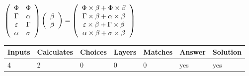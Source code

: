 \documentclass[12pt]{article}
\begin{document}
$  %
 \left( \begin{array}
 {
 c
 c
 }
 \Phi & 
 \Phi \\ 
 \Gamma & 
 \alpha \\ 
 \varepsilon & 
 \Gamma \\ 
 \alpha & 
 \sigma
 \end{array} \right)
 \left( \begin{array}
 {
 c
 }
 \beta \\ 
 \beta
 \end{array} \right)
=
 \left( \begin{array}
 {
 c
 }
  \Phi \times  \beta +  \Phi \times  \beta \\ 
  \Gamma \times  \beta +  \alpha \times  \beta \\ 
  \varepsilon \times  \beta +  \Gamma \times  \beta \\ 
  \alpha \times  \beta +  \sigma \times  \beta
 \end{array} \right)
$
 
 
 
\noindent{}
 
 

 
 
 
\noindent{}
 
 

 
 
\noindent{}
 
 

 
\vspace{0.3in}
   
   
   
   
\noindent\begin{tabular}{|l|l|l|l|l|l|l|}
 \hline
Inputs & Calculates & Choices & Layers & Matches & Answer & Solution \\ \hline
           4  & 
           2  & 
           0
  & 
           0  & 
           0  & 
  yes & 
  yes 
  \\ \hline
 \end{tabular}
   
   
   
   
\noindent{}
   
   
  
\end{document}

